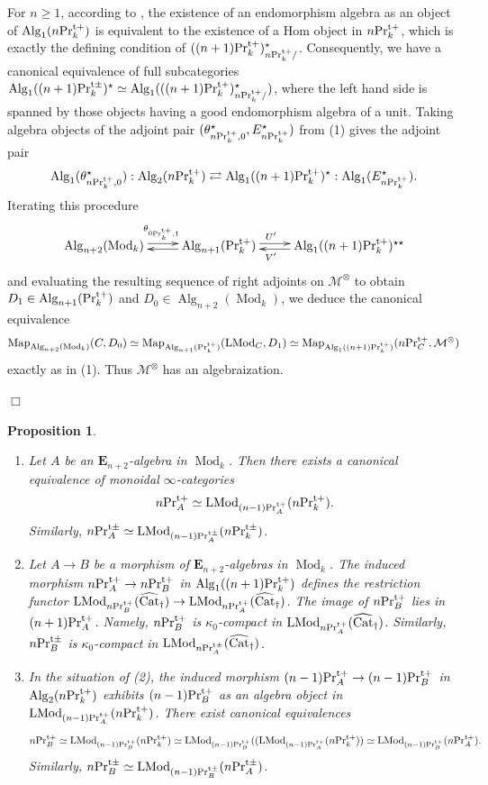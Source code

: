 \documentclass[leqno,12pt]{amsart}
\theoremstyle{plain}
\newtheorem{Proposition}[Theorem]{Proposition}
\theoremstyle{definition}
\newcommand{\PRTT}{\textup{Pr}^{\textup{t}+}}
\newcommand{\PRTTT}{\textup{Pr}^{\textup{t}\pm}}
\newcommand{\MMM}{\mathcal{M}}
\newcommand{\Mod}{\operatorname{Mod}}
\newcommand{\Map}{\operatorname{Map}}
\newcommand{\Alg}{\operatorname{Alg}}
\newcommand{\vCat}{\widehat{\operatorname{Cat}}_\dagger}
\newcommand{\LMod}{\operatorname{LMod}}
\newcommand{\QED}{{\unskip\nobreak\hfil\penalty50\quad\null\nobreak\hfil
{$\Box$}\parfillskip0pt\finalhyphendemerits0\par\medskip}}
\begin{document}
For $n\ge1$, according to \cite[4.7.1.40, 4.7.1.41]{HA}, the existence of an endomorphism algebra as an object of $\Alg_1(n\PRTT_k)$ is equivalent to the existence of a Hom object  in $n\PRTT_k$, which is exactly the defining condition of $((n+1)\PRTT_k)_{n\PRTT_k/}^\star$.
Consequently, we have a canonical equivalence of full subcategories $\Alg_1((n+1)\PRTTT_k)^\star \simeq \Alg_1(((n+1)\PRTT_k)_{n\PRTT_k/}^\star)$, where the left hand side is spanned by those objects having a good endomorphism algebra of a unit.
Taking algebra objects of the adjoint pair $(\theta_{n\PRTT_k,0}^\star,E_{n\PRTT_k}^\star)$ from (1) gives the adjoint pair
\[
\Alg_1(\theta_{n\PRTT_k,0}^\star):\Alg_2(n\PRTT_k)\rightleftarrows \Alg_1((n+1)\PRTT_k)^\star:\Alg_1(E_{n\PRTT_k}^\star).
\]
Iterating this procedure 
\[
\xymatrix{
\Alg_{n+2}(\Mod_k)   \ar@<0.5ex>[r]^{\theta_{0\PRTT_k,1}}  & \Alg_{n+1}(\PRTT_k)  \ar@<0.5ex>[l]   \ar@<0.5ex>[r]^(0.4){U'}  &  \Alg_1((n+1)\PRTT_k)^{\star \star}    \ar@<0.5ex>[l]^(0.6){V'} 
}
\]
and evaluating the resulting sequence of right adjoints on $\MMM^\otimes$ 
to obtain $D_1 \in \Alg_{n+1}(\PRTT_k)$ and $D_0 \in \Alg_{n+2}(\Mod_k)$, we deduce the canonical equivalence
\[
\Map_{\Alg_{n+2}(\Mod_k)}(C,D_0)\simeq \Map_{\Alg_{n+1}(\PRTT_k)}(\LMod_C,D_1)\simeq \Map_{ \Alg_1((n+1)\PRTT_k)}(n\PRTT_{C},\MMM^\otimes)
\]
exactly as in (1). Thus $\MMM^\otimes$ has an algebraization.
\QED





\begin{Proposition}
\label{matomete}
\begin{enumerate}
  \item Let $A$ be an $\mathbf{E}_{n+2}$-algebra in $\Mod_k$.
Then there exists a canonical equivalence of monoidal $\infty$-categories
\[
n\PRTT_A\simeq\LMod_{(n-1)\PRTT_A}(n\PRTT_k).
\]
Similarly, $n\PRTTT_A\simeq \LMod_{(n-1)\PRTTT_A}(n\PRTTT_k)$.

\item Let $A\to B$ be a morphism of $\mathbf{E}_{n+2}$-algebras in $\Mod_k$.
The induced morphism $n\PRTT_A\to n\PRTT_B$ in $\Alg_1((n+1)\PRTT_k)$
defines the restriction functor $\LMod_{n\PRTT_B}(\vCat)\to \LMod_{n\PRTT_A}(\vCat)$.
The image of $n\PRTT_B$ lies in $(n+1)\PRTT_A$.
Namely, $n\PRTT_B$ is $\kappa_0$-compact in $\LMod_{n\PRTT_A}(\vCat)$.
Similarly, $n\PRTTT_B$ is $\kappa_0$-compact in $\LMod_{n\PRTTT_A}(\vCat)$.



\item In the situation of (2),
the induced morphism $(n-1)\PRTT_A\to (n-1)\PRTT_B$ in $\Alg_2(n\PRTT_k)$ exhibits $(n-1)\PRTT_B$ as an algebra object in $\LMod_{(n-1)\PRTT_A}(n\PRTT_k)$.
There exist canonical equivalences
\[
n\PRTT_B\simeq\LMod_{(n-1)\PRTT_B}(n\PRTT_k)\simeq \LMod_{(n-1)\PRTT_B}((\LMod_{(n-1)\PRTT_A}(n\PRTT_k))\simeq\LMod_{(n-1)\PRTT_B}(n\PRTT_A).
\]
Similarly, $n\PRTTT_B\simeq \LMod_{(n-1)\PRTTT_B}(n\PRTTT_A)$. 



\end{enumerate}

\end{Proposition}
\end{document}
